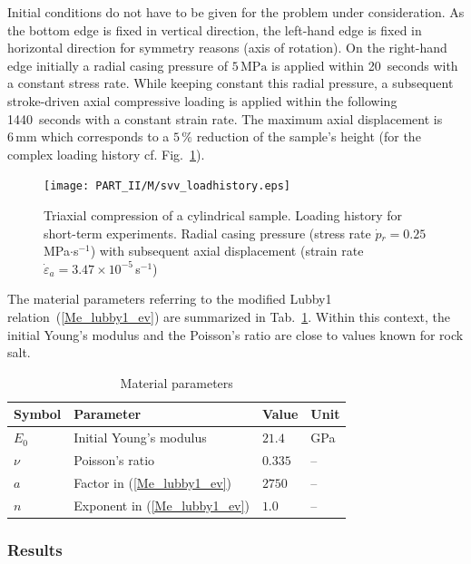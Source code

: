 Initial conditions do not have to be given for the problem under consideration. As the bottom edge is fixed in vertical direction, the left-hand edge is fixed in horizontal direction for symmetry reasons (axis of rotation). On the right-hand edge initially a radial casing pressure of $5\,\mbox{MPa}$ is applied within 20~seconds with a constant stress rate. While keeping constant this radial pressure, a subsequent stroke-driven axial compressive loading is applied within the following 1440~seconds with a constant strain rate. The maximum axial displacement is $6\,\mbox{mm}$ which corresponds to a $5\,\%$ reduction of the sample's height (for the complex loading history cf. Fig.~\ref{Me_triax_loadhist_lubby1}).
\begin{figure}[!htb]
\begin{center}
\texttt{[image: PART\_II/M/svv\_loadhistory.eps]}
\end{center}
\caption{Triaxial compression of a cylindrical sample. Loading history for short-term experiments. Radial casing pressure (stress rate $\dot{p}{}_r=0.25$\,MPa$\cdot$s$^{-1}$) with subsequent axial displacement (strain rate $\dot{\varepsilon}{}_a=3.47\times 10^{-5}$\,s$^{-1}$)} 
\label{Me_triax_loadhist_lubby1}
\end{figure}
 
The material parameters referring to the modified Lubby1 relation~(\ref{Me_lubby1_ev}) are summarized in Tab.~\ref{Me_matpar_lubby1}. Within this context, the initial Young's modulus and the Poisson's ratio are close to values known for rock salt.
 
 
\begin{table}[!htb]
\centering
\caption{Material parameters}
\label{Me_matpar_lubby1}
\begin{tabular}{llll}
\toprule
Symbol & Parameter & Value & Unit \\
\midrule
$E_0$ & Initial Young's modulus          & $21.4$  & GPa \\
$\nu$ & Poisson's ratio                  & $0.335$ & --  \\
$a$   & Factor in (\ref{Me_lubby1_ev})   & $2750$  & --  \\
$n$   & Exponent in (\ref{Me_lubby1_ev}) & $1.0$   & --  \\
\bottomrule
\end{tabular}
\end{table}

\subsubsection{Results}
\label{subsubsec:Me6_res}

